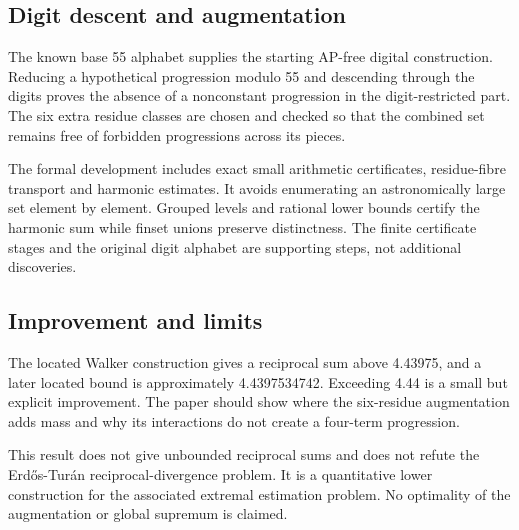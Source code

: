 \documentclass[11pt,a4paper]{article}
\begin{document}
\subsection{Digit descent and augmentation}
The known base 55 alphabet supplies the starting AP-free digital construction. Reducing a hypothetical progression modulo 55 and descending through the digits proves the absence of a nonconstant progression in the digit-restricted part. The six extra residue classes are chosen and checked so that the combined set remains free of forbidden progressions across its pieces.

The formal development includes exact small arithmetic certificates, residue-fibre transport and harmonic estimates. It avoids enumerating an astronomically large set element by element. Grouped levels and rational lower bounds certify the harmonic sum while finset unions preserve distinctness. The finite certificate stages and the original digit alphabet are supporting steps, not additional discoveries.

\subsection{Improvement and limits}
The located Walker construction gives a reciprocal sum above 4.43975, and a later located bound is approximately 4.4397534742. Exceeding 4.44 is a small but explicit improvement. The paper should show where the six-residue augmentation adds mass and why its interactions do not create a four-term progression.

This result does not give unbounded reciprocal sums and does not refute the Erdős-Turán reciprocal-divergence problem. It is a quantitative lower construction for the associated extremal estimation problem. No optimality of the augmentation or global supremum is claimed.
\end{document}
